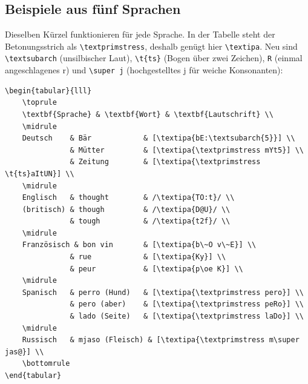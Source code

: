 \subsection{Beispiele aus fünf Sprachen}

Dieselben Kürzel funktionieren für jede Sprache. In der Tabelle steht der Betonungsstrich als \texttt{\textbackslash textprimstress}, deshalb genügt hier \texttt{\textbackslash textipa}. Neu sind \texttt{\textbackslash textsubarch} (unsilbischer Laut), \texttt{\textbackslash t\{ts\}} (Bogen über zwei Zeichen), \texttt{R} (einmal angeschlagenes r) und \texttt{\textbackslash super j} (hochgestelltes j für weiche Konsonanten):

\begin{lstlisting}[style=latex]
\begin{tabular}{lll}
	\toprule
	\textbf{Sprache} & \textbf{Wort} & \textbf{Lautschrift} \\
	\midrule
	Deutsch    & Bär            & [\textipa{bE:\textsubarch{5}}] \\
	           & Mütter         & [\textipa{\textprimstress mYt5}] \\
	           & Zeitung        & [\textipa{\textprimstress \t{ts}aItUN}] \\
	\midrule
	Englisch   & thought        & /\textipa{TO:t}/ \\
	(britisch) & though         & /\textipa{D@U}/ \\
	           & tough          & /\textipa{t2f}/ \\
	\midrule
	Französisch & bon vin       & [\textipa{b\~O v\~E}] \\
	           & rue            & [\textipa{Ky}] \\
	           & peur           & [\textipa{p\oe K}] \\
	\midrule
	Spanisch   & perro (Hund)   & [\textipa{\textprimstress pero}] \\
	           & pero (aber)    & [\textipa{\textprimstress peRo}] \\
	           & lado (Seite)   & [\textipa{\textprimstress laDo}] \\
	\midrule
	Russisch   & mjaso (Fleisch) & [\textipa{\textprimstress m\super jas@}] \\
	\bottomrule
\end{tabular}
\end{lstlisting}

